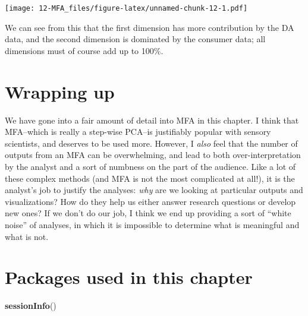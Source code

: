 \documentclass[
]{book}
\newenvironment{Shaded}{\begin{snugshade}}{\end{snugshade}}
\newcommand{\FunctionTok}[1]{\textcolor[rgb]{0.13,0.29,0.53}{\textbf{#1}}}
\newcommand{\NormalTok}[1]{#1}
\begin{document}
\texttt{[image: 12-MFA\_files/figure-latex/unnamed-chunk-12-1.pdf]}

We can see from this that the first dimension has more contribution by the DA data, and the second dimension is dominated by the consumer data; all dimensions must of course add up to 100\%.

\section{Wrapping up}\label{wrapping-up}

We have gone into a fair amount of detail into MFA in this chapter. I think that MFA--which is really a step-wise PCA--is justifiably popular with sensory scientists, and deserves to be used more. However, I \emph{also} feel that the number of outputs from an MFA can be overwhelming, and lead to both over-interpretation by the analyst and a sort of numbness on the part of the audience. Like a lot of these complex methods (and MFA is not the most complicated at all!), it is the analyst's job to justify the analyses: \emph{why} are we looking at particular outputs and visualizations? How do they help us either answer research questions or develop new ones? If we don't do our job, I think we end up providing a sort of ``white noise'' of analyses, in which it is impossible to determine what is meaningful and what is not.

\section{Packages used in this chapter}\label{packages-used-in-this-chapter-11}

\begin{Shaded}
\begin{Highlighting}[]
\FunctionTok{sessionInfo}\NormalTok{()}
\end{Highlighting}
\end{Shaded}
\end{document}
